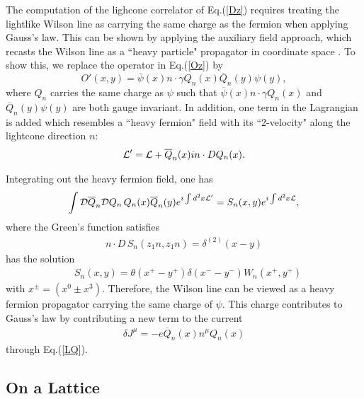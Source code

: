 \documentclass[aps,prd,twocolumn,tightenlines,superscriptaddress,
nofootinbib,preprintnumbers]{revtex4-1}
\renewcommand{\vec}[1]{\mathbf{#1}}
\begin{document}
The computation of the lighcone correlator of Eq.(\ref{Dz}) requires treating the lightlike Wilson line as carrying the same charge as the fermion when applying Gauss's law. This can be shown by applying the auxiliary field approach, which recasts the Wilson line as a ``heavy particle" propagator in coordinate space \cite{Chen:2016fxx,Ji:2017oey}. To show this, we replace the operator in Eq.(\ref{Oz}) by 
\begin{equation}\label{Eq:repl}
             O'(x, y) = \overline{\psi}(x)n\cdot\gamma Q_n(x) \overline{Q}_n(y) \psi(y) ,
\end{equation}
where $Q_n$ carries the same charge as $\psi$ such that $\overline{\psi}(x)n\cdot\gamma Q_n(x)$ and $\overline{Q}_n(y) \psi(y)$ are both gauge invariant. In addition, one term in the Lagrangian is added which resembles a ``heavy fermion" field with its ``2-velocity" along the lightcone direction $n$:
\begin{eqnarray}
\label{Eq:lag}
\label{LQ}
{\cal L'}={\cal L}+\overline Q_n(x)i n\cdot D Q_n(x).
\end{eqnarray}

Integrating out the heavy fermion field, one has 
\begin{eqnarray}
    \int{\cal D}\overline Q_n{\cal D}Q_n\, Q_n(x)\overline Q_n(y) e^{i\int d^2x {\cal L'}} 
    =S_n(x, y) e^{i\int d^2x {\cal L} },
\end{eqnarray}
where the Green's function satisfies 
\begin{eqnarray}
n\cdot D\, S_n(z_1 n, z_1 n)=\delta^{(2)}(x-y) 
\end{eqnarray}
has the solution
\begin{align}
&S_n(x,y)=\theta(x^+-y^+)\delta(x^--y^-)W_n(x^+,y^+) 
\end{align}
with $x^{\pm}=(x^0\pm x^3)$. Therefore, the Wilson line can be viewed as a heavy fermion propagator carrying the same charge of $\psi$. This charge contributes to Gauss's law by contributing a new term to the current  
\begin{eqnarray}
\delta J^{\mu}=-e \overline Q_n(x) n^{\mu} Q_n(x) 
\end{eqnarray}
through Eq.(\ref{LQ}).
 
\subsection{On a Lattice}
\end{document}
